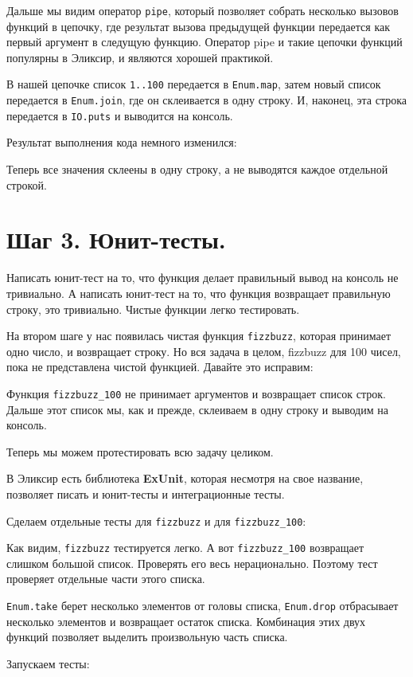 Дальше мы видим оператор \texttt{pipe}, который позволяет собрать несколько вызовов функций в цепочку, где результат вызова предыдущей функции передается как первый аргумент в следущую функцию. Оператор pipe и такие цепочки функций популярны в Эликсир, и являются хорошей практикой.

В нашей цепочке список \texttt{1..100} передается в \texttt{Enum.map}, затем новый список передается в \texttt{Enum.join}, где он склеивается в одну строку. И, наконец, эта строка передается в \texttt{IO.puts} и выводится на консоль.

Результат выполнения кода немного изменился:



Теперь все значения склеены в одну строку, а не выводятся каждое отдельной строкой.

\section{Шаг 3. Юнит-тесты.}

Написать юнит-тест на то, что функция делает правильный вывод на консоль не тривиально. А написать юнит-тест на то, что функция возвращает правильную строку, это тривиально. Чистые функции легко тестировать.

На втором шаге у нас появилась чистая функция \texttt{fizzbuzz}, которая принимает одно число, и возвращает строку. Но вся задача в целом, fizzbuzz для 100 чисел, пока не представлена чистой функцией. Давайте это исправим:



Функция \texttt{fizzbuzz\_100} не принимает аргументов и возвращает список строк. Дальше этот список мы, как и прежде, склеиваем в одну строку и выводим на консоль. 

Теперь мы можем протестировать всю задачу целиком.

В Эликсир есть библиотека \textbf{ExUnit}, которая несмотря на свое название, позволяет писать и юнит-тесты и интеграционные тесты.

Сделаем отдельные тесты для \texttt{fizzbuzz} и для \texttt{fizzbuzz\_100}:



Как видим, \texttt{fizzbuzz} тестируется легко. А вот \texttt{fizzbuzz\_100} возвращает слишком большой список. Проверять его весь нерационально. Поэтому тест проверяет отдельные части этого списка.

\texttt{Enum.take} берет несколько элементов от головы списка, \texttt{Enum.drop} отбрасывает несколько элементов и возвращает остаток списка. Комбинация этих двух функций позволяет выделить произвольную часть списка.

Запускаем тесты:



